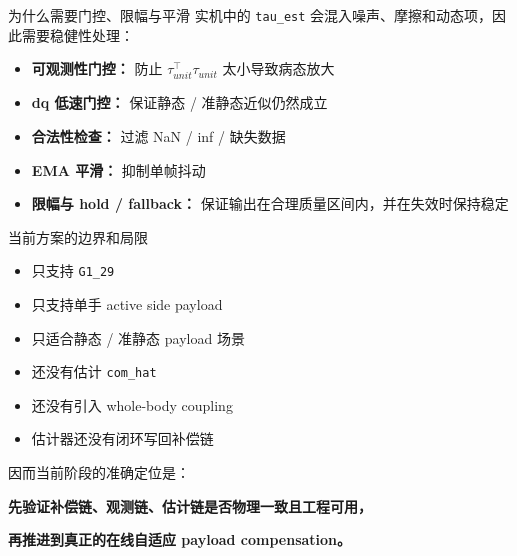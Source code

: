\documentclass[aspectratio=169,11pt]{ctexbeamer}
\begin{document}
\begin{frame}{为什么需要门控、限幅与平滑}
  实机中的 \texttt{tau\_est} 会混入噪声、摩擦和动态项，因此需要稳健性处理：
  \begin{itemize}
    \item \textbf{可观测性门控：} 防止 \(\tau_{unit}^{\top}\tau_{unit}\) 太小导致病态放大
    \item \textbf{dq 低速门控：} 保证静态 / 准静态近似仍然成立
    \item \textbf{合法性检查：} 过滤 NaN / inf / 缺失数据
    \item \textbf{EMA 平滑：} 抑制单帧抖动
    \item \textbf{限幅与 hold / fallback：} 保证输出在合理质量区间内，并在失效时保持稳定
  \end{itemize}
\end{frame}

\begin{frame}{当前方案的边界和局限}
  \begin{itemize}
    \item 只支持 \texttt{G1\_29}
    \item 只支持单手 active side payload
    \item 只适合静态 / 准静态 payload 场景
    \item 还没有估计 \texttt{com\_hat}
    \item 还没有引入 whole-body coupling
    \item 估计器还没有闭环写回补偿链
  \end{itemize}

  \vspace{0.4em}
  因而当前阶段的准确定位是：

  \vspace{0.2em}
  \textbf{先验证补偿链、观测链、估计链是否物理一致且工程可用，}

  \textbf{再推进到真正的在线自适应 payload compensation。}
\end{frame}
\end{document}
